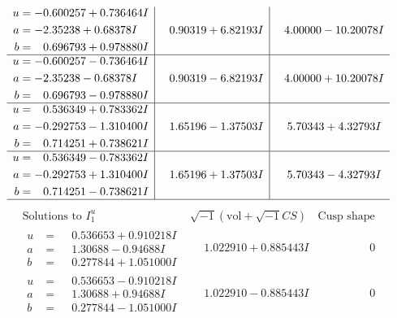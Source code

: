 \documentclass[1p]{elsarticle_modified}
\theoremstyle{definition}
\newcommand{\I}{\sqrt{-1}}
\begin{document}
$$\begin{array}{c|c|c}
\begin{aligned}
u &= -0.600257 + 0.736464 I \\
a &= -2.35238 + 0.68378 I \\
b &= \phantom{-}0.696793 + 0.978880 I\end{aligned}
 & \phantom{-}0.90319 + 6.82193 I & \phantom{-}4.00000 - 10.20078 I \\ \hline\begin{aligned}
u &= -0.600257 - 0.736464 I \\
a &= -2.35238 - 0.68378 I \\
b &= \phantom{-}0.696793 - 0.978880 I\end{aligned}
 & \phantom{-}0.90319 - 6.82193 I & \phantom{-}4.00000 + 10.20078 I \\ \hline\begin{aligned}
u &= \phantom{-}0.536349 + 0.783362 I \\
a &= -0.292753 - 1.310400 I \\
b &= \phantom{-}0.714251 + 0.738621 I\end{aligned}
 & \phantom{-}1.65196 - 1.37503 I & \phantom{-}5.70343 + 4.32793 I \\ \hline\begin{aligned}
u &= \phantom{-}0.536349 - 0.783362 I \\
a &= -0.292753 + 1.310400 I \\
b &= \phantom{-}0.714251 - 0.738621 I\end{aligned}
 & \phantom{-}1.65196 + 1.37503 I & \phantom{-}5.70343 - 4.32793 I\\
 \hline 
 \end{array}$$\newpage$$\begin{array}{c|c|c}  
\text{Solutions to }I^u_{1}& \I (\text{vol} + \sqrt{-1}CS) & \text{Cusp shape}\\
 \hline 
\begin{aligned}
u &= \phantom{-}0.536653 + 0.910218 I \\
a &= \phantom{-}1.30688 - 0.94688 I \\
b &= \phantom{-}0.277844 + 1.051000 I\end{aligned}
 & \phantom{-}1.022910 + 0.885443 I & \phantom{-0.000000 } 0 \\ \hline\begin{aligned}
u &= \phantom{-}0.536653 - 0.910218 I \\
a &= \phantom{-}1.30688 + 0.94688 I \\
b &= \phantom{-}0.277844 - 1.051000 I\end{aligned}
 & \phantom{-}1.022910 - 0.885443 I & \phantom{-0.000000 } 0 \\ \hline\begin{aligned}

\end{aligned}
\end{array}$$
\end{document}
